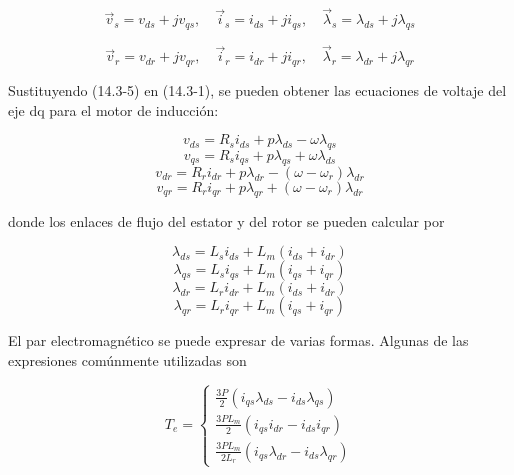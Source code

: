 \documentclass[letterpaper,12pt]{article}
\begin{document}
\begin{equation}
\vec{v}_s = v_{ds} + jv_{qs}, \quad \vec{i}_s = i_{ds} + ji_{qs}, \quad \vec{\lambda}_s = \lambda_{ds} + j\lambda_{qs} \tag{14.3-5}
\end{equation}

\begin{equation}
\vec{v}_r = v_{dr} + jv_{qr}, \quad \vec{i}_r = i_{dr} + ji_{qr}, \quad \vec{\lambda}_r = \lambda_{dr} + j\lambda_{qr} \tag{14.3-5}
\end{equation}

Sustituyendo (14.3-5) en (14.3-1), se pueden obtener las ecuaciones de voltaje del eje dq para el motor de inducción:

\begin{equation}
v_{ds} = R_s i_{ds} + p\lambda_{ds} - \omega \lambda_{qs} \tag{14.3-6}
\end{equation}
\begin{equation}
v_{qs} = R_s i_{qs} + p\lambda_{qs} + \omega \lambda_{ds} \tag{14.3-6}
\end{equation}
\begin{equation}
v_{dr} = R_r i_{dr} + p\lambda_{dr} - (\omega - \omega_r)\lambda_{dr} \tag{14.3-6}
\end{equation}
\begin{equation}
v_{qr} = R_r i_{qr} + p\lambda_{qr} + (\omega - \omega_r)\lambda_{dr} \tag{14.3-6}
\end{equation}

donde los enlaces de flujo del estator y del rotor se pueden calcular por

\begin{equation}
\lambda_{ds} = L_s i_{ds} + L_m (i_{ds} + i_{dr}) \tag{14.3-7}
\end{equation}
\begin{equation}
\lambda_{qs} = L_s i_{qs} + L_m (i_{qs} + i_{qr}) \tag{14.3-7}
\end{equation}
\begin{equation}
\lambda_{dr} = L_r i_{dr} + L_m (i_{ds} + i_{dr}) \tag{14.3-7}
\end{equation}
\begin{equation}
\lambda_{qr} = L_r i_{qr} + L_m (i_{qs} + i_{qr}) \tag{14.3-7}
\end{equation}

El par electromagnético se puede expresar de varias formas. Algunas de las expresiones comúnmente utilizadas son

\begin{equation}
T_e = \left\{
\begin{array}{l}
\frac{3P}{2}(i_{qs}\lambda_{ds} - i_{ds}\lambda_{qs}) \\
\frac{3PL_m}{2}(i_{qs}i_{dr} - i_{ds}i_{qr}) \\
\frac{3PL_m}{2L_r}(i_{qs}\lambda_{dr} - i_{ds}\lambda_{qr})
\end{array} \tag{14.3-8}
\right.
\end{equation}
\end{document}
